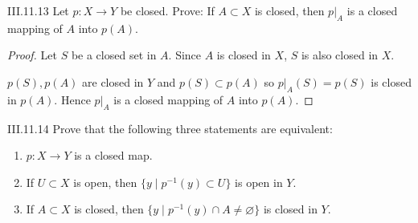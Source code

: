 \begin{problem}{III.11.13}
Let \( p: X \to Y \) be closed. Prove: If \( A \subset X \) is closed, then \( p\vert_{A} \) is a closed mapping of \( A \) into \( p(A) \).
\end{problem}

\begin{proof}
	Let \( S \) be a closed set in \( A \). Since \( A \) is closed in \( X \), \( S \) is also closed in \( X \).

	\( p(S), p(A) \) are closed in \( Y \) and \( p(S) \subset p(A) \) so \( p\vert_{A}(S) = p(S) \) is closed in \( p(A) \). Hence \( p\vert_{A} \) is a closed mapping of \(A\) into \(p(A)\).
\end{proof}

\begin{problem}{III.11.14}
Prove that the following three statements are equivalent:
\begin{enumerate}[label={(\alph*)}]
	\item \( p: X \to Y \) is a closed map.
	\item If \( U \subset X \) is open, then \(\{ y \mid p^{-1}(y) \subset U \}\) is open in \( Y \).
	\item If \( A \subset X \) is closed, then \(\{ y \mid p^{-1}(y) \cap A \neq \varnothing \}\) is closed in \( Y \).
\end{enumerate}
\end{problem}

